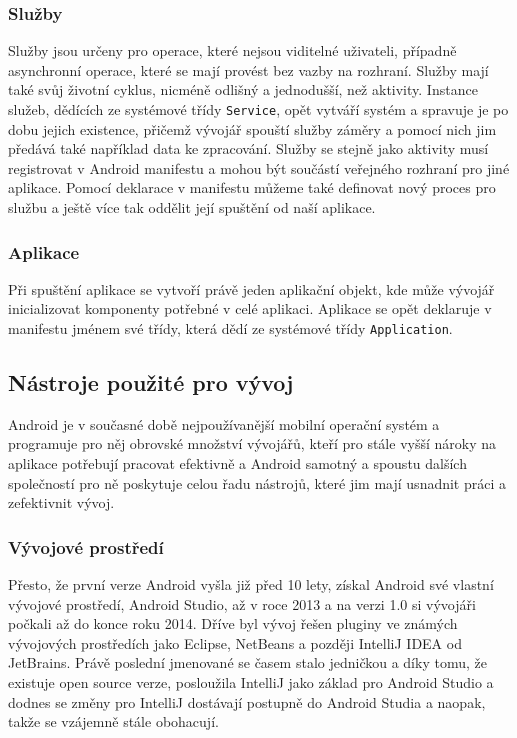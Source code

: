 \documentclass[czech,master,public,dept460,male,java,cpdeclaration]{diploma}
\begin{document}
\subsubsection{Služby}
Služby jsou určeny pro operace, které nejsou viditelné uživateli, případně asynchronní operace, které se mají
provést bez vazby na rozhraní. Služby mají také svůj životní cyklus, nicméně odlišný a jednodušší,
než aktivity. Instance služeb, dědících ze systémové třídy \texttt{Service}, opět vytváří
systém a spravuje je po dobu jejich existence,
přičemž vývojář spouští služby záměry a pomocí nich jim předává také například data ke zpracování.
Služby se stejně jako aktivity musí registrovat v Android manifestu a mohou být součástí veřejného
rozhraní pro jiné aplikace. Pomocí deklarace v manifestu můžeme také definovat nový proces pro službu
a ještě více tak oddělit její spuštění od naší aplikace.

\subsubsection{Aplikace}
Při spuštění aplikace se vytvoří právě jeden aplikační objekt, kde může vývojář inicializovat
komponenty potřebné v celé aplikaci. Aplikace se opět deklaruje v manifestu jménem své třídy, která
dědí ze systémové třídy \texttt{Application}.

\subsection{Nástroje použité pro vývoj}
Android je v současné době nejpoužívanější mobilní operační systém a programuje pro něj obrovské
množství vývojářů, kteří pro stále vyšší nároky na aplikace potřebují pracovat efektivně a Android samotný
a spoustu dalších společností pro ně poskytuje celou řadu nástrojů, které jim mají usnadnit práci a zefektivnit vývoj.

\subsubsection{Vývojové prostředí}
Přesto, že první verze Android vyšla již před 10 lety, získal Android své vlastní vývojové prostředí, Android Studio,
až v roce 2013 a na verzi 1.0 si vývojáři počkali až do konce roku 2014. Dříve byl vývoj řešen pluginy ve známých
vývojových prostředích jako Eclipse, NetBeans a později IntelliJ IDEA od JetBrains. Právě poslední jmenované
se časem stalo jedničkou a díky tomu, že existuje open source verze, posloužila IntelliJ jako základ pro Android Studio
a dodnes se změny pro IntelliJ dostávají postupně do Android Studia a naopak, takže se vzájemně stále obohacují.
\end{document}
